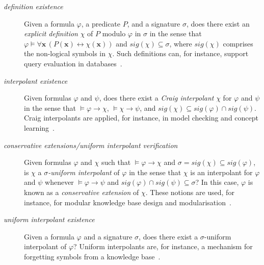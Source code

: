 \documentclass{lmcs} %
\theoremstyle{plain}\newtheorem{satz}[thm]{Satz} %
\newcommand{\avec}[1]{\boldsymbol{#1}}
\newcommand{\sig}{\mathit{sig}}
\begin{document}
\begin{description} 
\item[\emph{definition existence}] Given a formula $\varphi$, a predicate $P$, and a signature $\sigma$, does there exist an \emph{explicit definition} $\chi$ of $P$ modulo $\varphi$ in $\sigma$ in the sense that \mbox{$\varphi\models \forall \avec{x}\, (P(\avec{x}) \leftrightarrow \chi(\avec{x}))$} and $\sig(\chi)\subseteq \sigma$, where $\sig(\chi)$ comprises the non-logical symbols in $\chi$. Such definitions can, for instance, support query evaluation in databases~\cite{DBLP:series/synthesis/2011Toman,DBLP:series/synthesis/2016Benedikt}.

\item[\emph{interpolant existence}] Given formulas $\varphi$ and $\psi$, does there exist a \emph{Craig interpolant} $\chi$ for $\varphi$ and $\psi$ in the sense 
that $\models \varphi \rightarrow \chi$, $\models \chi \rightarrow \psi$, and
\mbox{$\sig(\chi)\subseteq \sig(\varphi) \cap \sig(\psi)$}. Craig interpolants are applied, for instance, in model checking and concept learning~\cite{DBLP:reference/mc/McMillan18,DBLP:journals/ai/JungLPW22}.

\item[\emph{conservative extensions/uniform interpolant verification}] Given formulas $\varphi$ and $\chi$ such that $\models \varphi \rightarrow \chi$ and $\sigma=\sig(\chi)\subseteq \sig(\varphi)$, is $\chi$ a \emph{$\sigma$-uniform interpolant} of $\varphi$ in the sense that $\chi$ is an interpolant for $\varphi$ and $\psi$ whenever $\models \varphi\rightarrow \psi$ and $\sig(\varphi)\cap \sig(\psi) \subseteq \sigma$? In this case, $\varphi$ is known as a \emph{conservative extension} of $\chi$. These notions are used, for instance, for modular knowledge base design and modularisation~\cite{DBLP:conf/rweb/BotoevaKLRWZ16}.  

\item[\emph{uniform interpolant existence}] Given a formula $\varphi$ and a signature $\sigma$, does there exist a $\sigma$-uniform interpolant 
of $\varphi$? Uniform interpolants are, for instance, a mechanism for forgetting symbols from a knowledge base~\cite{DBLP:journals/ki/EiterK19,DBLP:journals/tplp/GoncalvesKL23,DBLP:series/lncs/KonevLWW09,DBLP:journals/ki/Koopmann20}.
\end{description} 
\end{document}
